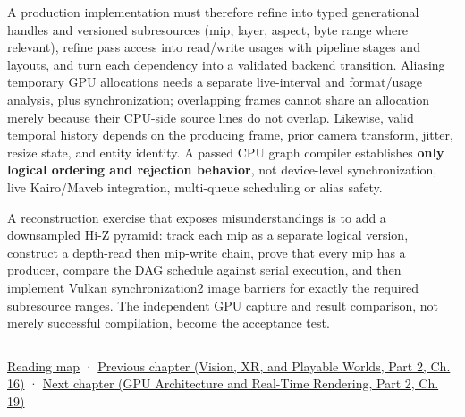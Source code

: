A production implementation must therefore refine  into typed generational handles and versioned subresources (mip, layer, aspect, byte range where relevant), refine pass access into read/write usages with pipeline stages and layouts, and turn each dependency into a validated backend transition. Aliasing temporary GPU allocations needs a separate live-interval and format/usage analysis, plus synchronization; overlapping frames cannot share an allocation merely because their CPU-side source lines do not overlap. Likewise, valid temporal history depends on the producing frame, prior camera transform, jitter, resize state, and entity identity. A passed CPU graph compiler establishes \textbf{only logical ordering and rejection behavior}, not device-level synchronization, live Kairo/Maveb integration, multi-queue scheduling or alias safety.

A reconstruction exercise that exposes misunderstandings is to add a downsampled Hi-Z pyramid: track each mip as a separate logical version, construct a depth-read then mip-write chain, prove that every mip has a producer, compare the DAG schedule against serial execution, and then implement Vulkan synchronization2 image barriers for exactly the required subresource ranges. The independent GPU capture and result comparison, not merely successful compilation, become the acceptance test.

\begin{center}\rule{0.5\linewidth}{0.5pt}\end{center}

\hyperref[volume-reading-map]{Reading map} · \href{../07-Vision-XR-and-Playable-Worlds-P02/main.pdf\#nameddest=06-engine-ii-ch041-evidence-tools-and-revisable-design}{Previous chapter (Vision, XR, and Playable Worlds, Part 2, Ch. 16)} · \href{../06-GPU-Architecture-and-Real-Time-Rendering-P02/main.pdf\#nameddest=06-engine-ii-ch043-compiling-renderer-intent-into-backend-work}{Next chapter (GPU Architecture and Real-Time Rendering, Part 2, Ch. 19)}
